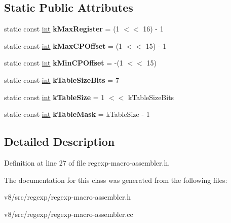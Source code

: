 \subsection*{Static Public Attributes}
\begin{DoxyCompactItemize}
\item 
\mbox{\label{classv8_1_1internal_1_1RegExpMacroAssembler_aab3ae21c4255e84293d23f61d9916cbf}} 
static const \mbox{\hyperlink{classint}{int}} {\bfseries k\+Max\+Register} = (1 $<$$<$ 16) -\/ 1
\item 
\mbox{\label{classv8_1_1internal_1_1RegExpMacroAssembler_ab05cfb65132cef288534e395a058d773}} 
static const \mbox{\hyperlink{classint}{int}} {\bfseries k\+Max\+C\+P\+Offset} = (1 $<$$<$ 15) -\/ 1
\item 
\mbox{\label{classv8_1_1internal_1_1RegExpMacroAssembler_a70bb0c9a038cdaff24b24f4af8fd9586}} 
static const \mbox{\hyperlink{classint}{int}} {\bfseries k\+Min\+C\+P\+Offset} = -\/(1 $<$$<$ 15)
\item 
\mbox{\label{classv8_1_1internal_1_1RegExpMacroAssembler_a8718bcee67dbdf905a30f8e81dfce44f}} 
static const \mbox{\hyperlink{classint}{int}} {\bfseries k\+Table\+Size\+Bits} = 7
\item 
\mbox{\label{classv8_1_1internal_1_1RegExpMacroAssembler_aed8b41d2ad7dc04d332f8051017a12ea}} 
static const \mbox{\hyperlink{classint}{int}} {\bfseries k\+Table\+Size} = 1 $<$$<$ k\+Table\+Size\+Bits
\item 
\mbox{\label{classv8_1_1internal_1_1RegExpMacroAssembler_a9337d4910330fb9eb954b2b5e2ae933f}} 
static const \mbox{\hyperlink{classint}{int}} {\bfseries k\+Table\+Mask} = k\+Table\+Size -\/ 1
\end{DoxyCompactItemize}


\subsection{Detailed Description}


Definition at line 27 of file regexp-\/macro-\/assembler.\+h.



The documentation for this class was generated from the following files\+:\begin{DoxyCompactItemize}
\item 
v8/src/regexp/regexp-\/macro-\/assembler.\+h\item 
v8/src/regexp/regexp-\/macro-\/assembler.\+cc\end{DoxyCompactItemize}
